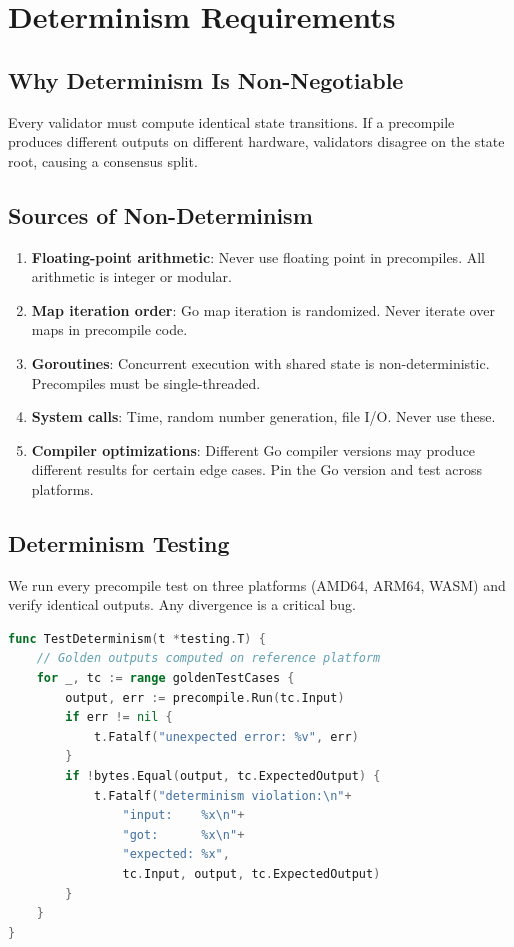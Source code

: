 \section{Determinism Requirements}


\subsection{Why Determinism Is Non-Negotiable}

Every validator must compute identical state transitions. If a precompile produces
different outputs on different hardware, validators disagree on the state root, causing
a consensus split.

\subsection{Sources of Non-Determinism}

\begin{enumerate}[nosep]
  \item \textbf{Floating-point arithmetic}: Never use floating point in precompiles.
    All arithmetic is integer or modular.
  \item \textbf{Map iteration order}: Go map iteration is randomized. Never iterate over
    maps in precompile code.
  \item \textbf{Goroutines}: Concurrent execution with shared state is non-deterministic.
    Precompiles must be single-threaded.
  \item \textbf{System calls}: Time, random number generation, file I/O. Never use these.
  \item \textbf{Compiler optimizations}: Different Go compiler versions may produce
    different results for certain edge cases. Pin the Go version and test across platforms.
\end{enumerate}

\subsection{Determinism Testing}

We run every precompile test on three platforms (AMD64, ARM64, WASM) and verify identical
outputs. Any divergence is a critical bug.

\begin{lstlisting}[language=Go,caption={Determinism test}]
func TestDeterminism(t *testing.T) {
    // Golden outputs computed on reference platform
    for _, tc := range goldenTestCases {
        output, err := precompile.Run(tc.Input)
        if err != nil {
            t.Fatalf("unexpected error: %v", err)
        }
        if !bytes.Equal(output, tc.ExpectedOutput) {
            t.Fatalf("determinism violation:\n"+
                "input:    %x\n"+
                "got:      %x\n"+
                "expected: %x",
                tc.Input, output, tc.ExpectedOutput)
        }
    }
}
\end{lstlisting}

